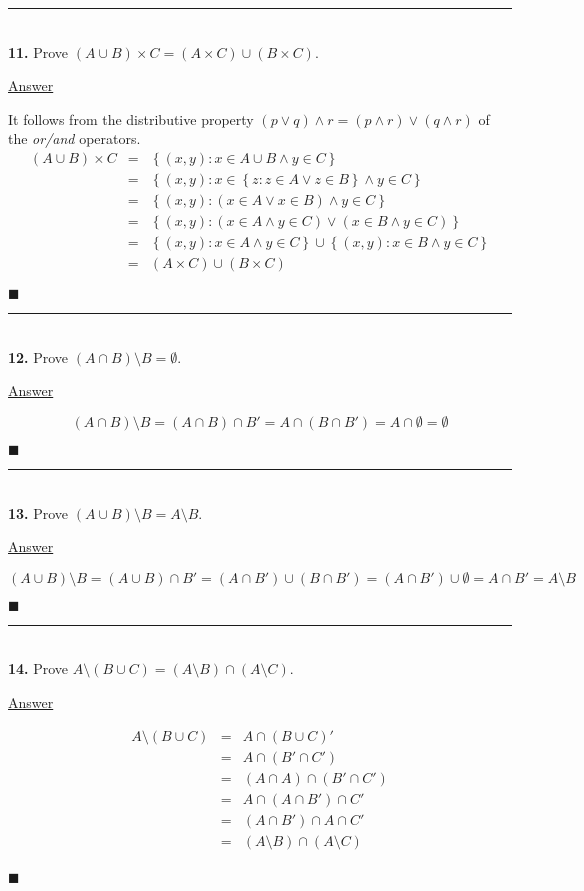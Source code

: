 \documentclass{article}[10pt]
\newenvironment{exercise}[1]
    {\noindent\rule{2cm}{0.4pt} \\
     \textbf{#1.}}
    {}
\newcommand{\answer}{

  \underline{Answer}

}
\newcommand{\qed}{

\hfill\ensuremath{\blacksquare}

}
\begin{document}
\begin{exercise}{11}
  Prove $(A \cup B) \times C = (A \times C) \cup (B \times C)$.
  \answer
  It follows from the distributive property
  $(p \lor q) \land r = (p \land r) \lor (q \land r)$
  of the \emph{or/and} operators.
  \[\begin{array}{rcl}
    (A \cup B) \times C
    &=& \left\{ (x, y) : x \in A \cup B \land y \in C \right\} \\
    &=& \left\{ (x, y) : x \in \left\{ z : z \in A \lor z \in B
                               \right\} \land y \in C
        \right\} \\
    &=& \left\{ (x, y) : (x \in A \lor x \in B) \land y \in C
        \right\} \\
    &=& \left\{ (x, y) : (x \in A \land y \in C) \lor
                         (x \in B \land y \in C)
        \right\} \\
    &=& \left\{ (x, y) : x \in A \land y \in C \right\} \cup
        \left\{ (x, y) : x \in B \land y \in C \right\} \\
    &=& (A \times C) \cup (B \times C)
  \end{array}\]
  \qed
\end{exercise}


\begin{exercise}{12}
  Prove $(A \cap B) \setminus B = \emptyset$.
  \answer
  \[
    (A \cap B) \setminus B
    = (A \cap B) \cap B'
    = A \cap (B \cap B')
    = A \cap \emptyset
    = \emptyset
  \]
  \qed
\end{exercise}


\begin{exercise}{13}
  Prove $(A \cup B) \setminus B = A \setminus B$.
  \answer
  \[
    (A \cup B) \setminus B
    = (A \cup B) \cap B'
    = (A \cap B') \cup (B \cap B')
    = (A \cap B') \cup \emptyset
    = A \cap B'
    = A \setminus B
  \]
  \qed
\end{exercise}


\begin{exercise}{14}
  Prove $A \setminus (B \cup C) = (A \setminus B) \cap
                                  (A \setminus C)$.
  \answer
  \[\begin{array}{rcl}
    A \setminus (B \cup C)
    &=& A \cap (B \cup C)' \\
    &=& A \cap (B' \cap C') \\
    &=& (A \cap A) \cap (B' \cap C') \\
    &=& A \cap (A \cap B') \cap C' \\
    &=& (A \cap B') \cap A \cap C' \\
    &=& (A \setminus B) \cap (A \setminus C) \\
  \end{array}\]
  \qed
\end{exercise}
\end{document}
